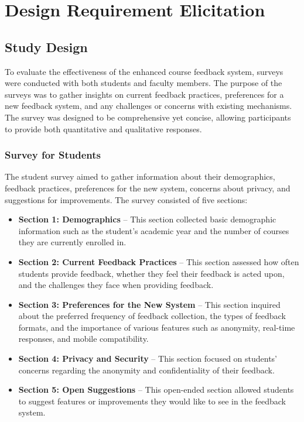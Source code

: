 \documentclass[conference]{IEEEtran}
\begin{document}
\section{Design Requirement Elicitation}
\subsection{Study Design}

To evaluate the effectiveness of the enhanced course feedback system, surveys were conducted with both students and faculty members. The purpose of the surveys was to gather insights on current feedback practices, preferences for a new feedback system, and any challenges or concerns with existing mechanisms. The survey was designed to be comprehensive yet concise, allowing participants to provide both quantitative and qualitative responses.

\subsubsection{Survey for Students}
The student survey aimed to gather information about their demographics, feedback practices, preferences for the new system, concerns about privacy, and suggestions for improvements. The survey consisted of five sections:

\begin{itemize}
    \item \textbf{Section 1: Demographics} – This section collected basic demographic information such as the student's academic year and the number of courses they are currently enrolled in.
    \item \textbf{Section 2: Current Feedback Practices} – This section assessed how often students provide feedback, whether they feel their feedback is acted upon, and the challenges they face when providing feedback.
    \item \textbf{Section 3: Preferences for the New System} – This section inquired about the preferred frequency of feedback collection, the types of feedback formats, and the importance of various features such as anonymity, real-time responses, and mobile compatibility.
    \item \textbf{Section 4: Privacy and Security} – This section focused on students' concerns regarding the anonymity and confidentiality of their feedback.
    \item \textbf{Section 5: Open Suggestions} – This open-ended section allowed students to suggest features or improvements they would like to see in the feedback system.
\end{itemize}
\end{document}

